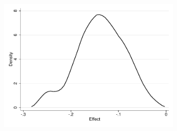 \documentclass[11pt]{article}
\begin{document}
\begin{figure}[H]
\begin{center}
\begin{subfigure}{0.42\textwidth}
        \includegraphics[width=\textwidth]{Figuras/he_dist_def_c_pro_2.pdf}
    \end{subfigure}


\end{center}
\end{figure}
\end{document}
